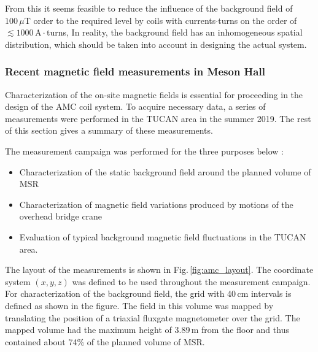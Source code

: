 From this it seems feasible to reduce the influence of the background field of $100\,\mu$T order to the required level by coils with currents$\cdot$turns on the order of  $\lesssim 1000\,\mathrm{A}\cdot$turns, In reality, the background field has an inhomogeneous spatial distribution, which should be taken into account in designing the actual system. 




\subsubsection*{Recent magnetic field measurements in Meson Hall}\label{sec:amc_recent}
Characterization of the on-site magnetic fields is essential for proceeding in the design of the AMC coil system. To acquire necessary data, a series of measurements were performed in the TUCAN area in the summer 2019. The rest of this section gives a summary of these measurements.

The  measurement campaign was performed for the three purposes below :
\begin{itemize}
    \item Characterization of the static background field around the planned volume of MSR
    \item Characterization of magnetic field variations produced by motions of the overhead bridge crane
        \item Evaluation of  typical background magnetic field fluctuations in the TUCAN area.
\end{itemize}
The layout of the measurements is shown in Fig.\,\ref{fig:amc_layout}. The coordinate system $(x,y,z)$ was defined to be used throughout the measurement campaign. 
For characterization of the background field, the grid with 40\,cm intervals is defined as shown in the figure. The field in this volume was mapped by translating the position of a triaxial fluxgate magnetometer over the grid. The mapped volume had the maximum height of 3.89\,m from the  floor and thus contained about 74\% of the planned volume of MSR. 

